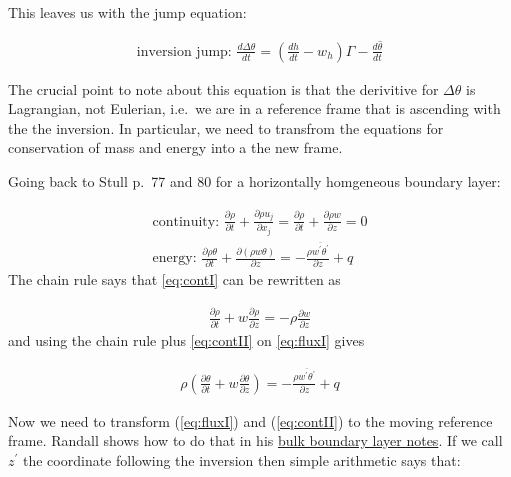 \documentclass[12pt]{article}
\begin{document}
This leaves us with the jump equation:

\begin{gather*}
\text{inversion jump: } \frac{d \Delta \theta }{dt} = \left ( \frac{dh }{dt}  - w_h \right ) \Gamma - \frac{d \hat{\theta} }{dt}
\end{gather*}


The crucial point to note about this equation is that the derivitive for $\Delta \theta$ is Lagrangian, not Eulerian, 
i.e.~we are in a reference frame that is ascending with the the inversion.   In particular, we need to 
transfrom the equations for conservation of mass and energy into a the new frame.

Going back to Stull p.~77 and 80 for a horizontally homgeneous boundary layer:



\begin{gather}
  \text{continuity: } \frac{ \partial \rho}{\partial t} + \frac{ \partial \rho u_j}{\partial x_j} =
\frac{ \partial \rho}{\partial t} + \frac{ \partial \rho w}{\partial z}=0\label{eq:contI}\\
\text{energy: } \frac{\partial \rho  \theta}{\partial t} + \frac{\partial  (\rho w \theta)}{\partial z}  = 
    - \frac{ \rho \overline{ w^\prime \theta^\prime}}{\partial z}  + q\label{eq:fluxI}
\end{gather}
The chain rule says that \eqref{eq:contI} can be rewritten as

\begin{gather}
\label{eq:contII}
  \frac{ \partial \rho}{\partial t} +
w \frac{ \partial \rho }{\partial z}= - \rho \frac{ \partial w }{\partial z}
\end{gather}
and using the chain rule plus \eqref{eq:contII} on \eqref{eq:fluxI} gives

\begin{gather}
\label{eq:energyII}
\rho  \left (   \frac{\partial  \theta}{\partial t} + w \frac{ \partial \theta}{\partial z}  \right ) = 
    - \frac{ \rho \overline{ w^\prime \theta^\prime}}{\partial z}  + q
\end{gather}

Now we need to transform (\ref{eq:fluxI}) and (\ref{eq:contII}) to the moving
reference frame.  Randall shows how to do that in his \href{https://www.dropbox.com/scl/fi/ojz6edmlj1tegbe6rxnvr/Bulk_PBL_Models.pdf?rlkey=3b9s1o3k8oi57flaykzc0obw9&dl=0}%
{bulk boundary layer notes}.  If
we call $z^\prime$ the coordinate following the inversion then simple arithmetic
says that:
\end{document}
